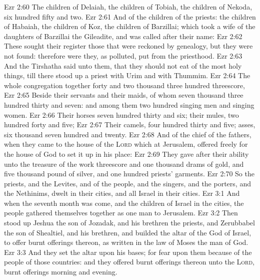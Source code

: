 \vs Ezr 2:60 The children of Delaiah, the children of Tobiah, the children of Nekoda, six hundred fifty and two.
\vs Ezr 2:61 And of the children of the priests: the children of Habaiah, the children of Koz, the children of Barzillai; which took a wife of the daughters of Barzillai the Gileadite, and was called after their name:
\vs Ezr 2:62 These sought their register  those that were reckoned by genealogy, but they were not found: therefore were they, as polluted, put from the priesthood.
\vs Ezr 2:63 And the Tirshatha said unto them, that they should not eat of the most holy things, till there stood up a priest with Urim and with Thummim.
\vs Ezr 2:64 The whole congregation together  forty and two thousand three hundred  threescore,
\vs Ezr 2:65 Beside their servants and their maids, of whom  seven thousand three hundred thirty and seven: and  among them two hundred singing men and singing women.
\vs Ezr 2:66 Their horses  seven hundred thirty and six; their mules, two hundred forty and five;
\vs Ezr 2:67 Their camels, four hundred thirty and five;  asses, six thousand seven hundred and twenty.
\vs Ezr 2:68 And  of the chief of the fathers, when they came to the house of the \textsc{Lord} which  at Jerusalem, offered freely for the house of God to set it up in his place:
\vs Ezr 2:69 They gave after their ability unto the treasure of the work threescore and one thousand drams of gold, and five thousand pound of silver, and one hundred priests' garments.
\vs Ezr 2:70 So the priests, and the Levites, and  of the people, and the singers, and the porters, and the Nethinims, dwelt in their cities, and all Israel in their cities.
\vs Ezr 3:1 And when the seventh month was come, and the children of Israel  in the cities, the people gathered themselves together as one man to Jerusalem.
\vs Ezr 3:2 Then stood up Jeshua the son of Jozadak, and his brethren the priests, and Zerubbabel the son of Shealtiel, and his brethren, and builded the altar of the God of Israel, to offer burnt offerings thereon, as  written in the law of Moses the man of God.
\vs Ezr 3:3 And they set the altar upon his bases; for fear  upon them because of the people of those countries: and they offered burnt offerings thereon unto the \textsc{Lord},  burnt offerings morning and evening.
